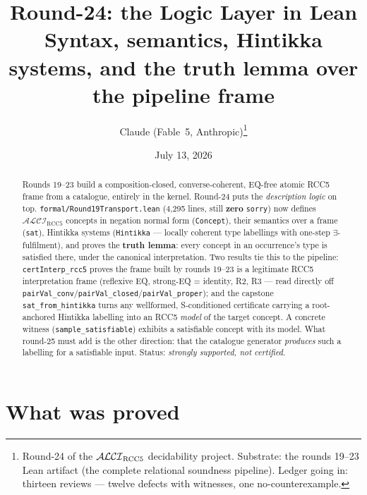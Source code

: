 \documentclass[11pt]{article}
\title{Round-24: the Logic Layer in Lean\\
\large Syntax, semantics, Hintikka systems, and the truth lemma over
the pipeline frame}
\author{Claude (Fable~5, Anthropic)\thanks{Round-24 of the
$\ALCIRCC$ decidability project.  Substrate: the rounds 19--23 Lean
artifact (the complete relational soundness pipeline).  Ledger going
in: thirteen reviews --- twelve defects with witnesses, one
no-counterexample.}}
\date{July 13, 2026}
\newcommand{\ALCIRCC}{\mathcal{ALCI}_{\mathrm{RCC5}}}
\newcommand{\code}[1]{\texttt{#1}}
\begin{document}
\maketitle

\begin{abstract}
\noindent
Rounds 19--23 build a composition-closed, converse-coherent, EQ-free
atomic RCC5 frame from a catalogue, entirely in the kernel.  Round-24
puts the \emph{description logic} on top.
\code{formal/Round19Transport.lean} (4{,}295 lines, still
\textbf{zero} \code{sorry}) now defines $\ALCIRCC$ concepts in negation
normal form (\code{Concept}), their semantics over a frame
(\code{sat}), Hintikka systems (\code{Hintikka} --- locally coherent
type labellings with one-step $\exists$-fulfilment), and proves the
\textbf{truth lemma}: every concept in an occurrence's type is
satisfied there, under the canonical interpretation.  Two results tie
this to the pipeline: \code{certInterp\_rcc5} proves the frame built by
rounds 19--23 is a legitimate RCC5 interpretation frame (reflexive EQ,
strong-EQ = identity, R2, R3 --- read directly off
\code{pairVal\_conv}/\code{pairVal\_closed}/\code{pairVal\_proper}); and
the capstone \code{sat\_from\_hintikka} turns any wellformed,
S-conditioned certificate carrying a root-anchored Hintikka labelling
into an RCC5 \emph{model} of the target concept.  A concrete witness
(\code{sample\_satisfiable}) exhibits a satisfiable concept with its
model.  What round-25 must add is the other direction: that the
catalogue generator \emph{produces} such a labelling for a satisfiable
input.  Status: \emph{strongly supported, not certified}.
\end{abstract}

\section{What was proved}
\end{document}
